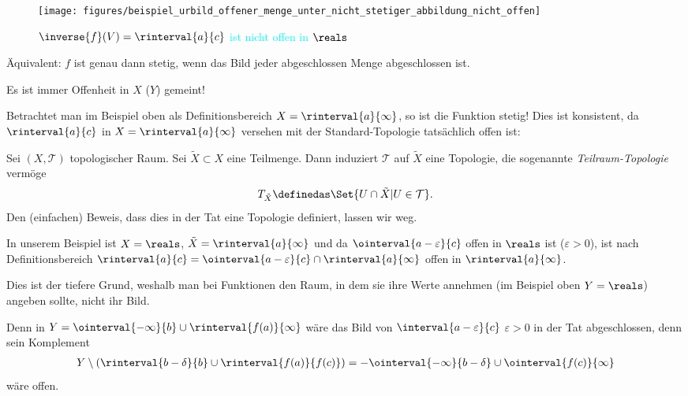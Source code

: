 \begin{figure}[H]
    \centering
    \texttt{[image: figures/beispiel\_urbild\_offener\_menge\_unter\_nicht\_stetiger\_abbildung\_nicht\_offen]}
    \caption*{\textcolor{Cyan}{\( \inverse{f}(V)=\rinterval{a}{c} \) ist nicht offen in \( \reals \)}}
    \label{fig:beispiel_urbild_offener_menge_unter_nicht_stetiger_abbildung_nicht_offen}
\end{figure}
\begin{bemerkung*}
    Äquivalent: \( f \) ist genau dann stetig, wenn das Bild jeder abgeschlossen Menge abgeschlossen ist.
\end{bemerkung*}
Es ist immer Offenheit in \( X \) (\bzw \( Y \)) gemeint!

Betrachtet man im Beispiel oben als Definitionsbereich \( X=\rinterval{a}{\infty} \), so ist die Funktion stetig! 
Dies ist konsistent, da \( \rinterval{a}{c} \) in \( X=\rinterval{a}{\infty} \) versehen mit der Standard-Topologie tatsächlich offen ist:
\begin{defsatz}
    Sei \( (X,\mathcal{T}) \) topologischer Raum. Sei \( \tilde{X}\subset X \) eine Teilmenge. Dann induziert \( \mathcal{T} \) auf \( \tilde{X}  \) eine Topologie, die sogenannte \emph{Teilraum-Topologie} vermöge
    \begin{align*}
        T_{\tilde{X}}\definedas \Set{U\cap \tilde{X}|U\in \mathcal{T}}.
    \end{align*}
    Den (einfachen) Beweis, dass dies in der Tat eine Topologie definiert, lassen wir weg.
\end{defsatz}

In unserem Beispiel ist \( X=\reals \), \( \tilde{X}=\rinterval{a}{\infty} \) und da \( \ointerval{a-\varepsilon}{c} \) offen in \( \reals \) ist (\( \varepsilon>0 \)), ist nach Definitionsbereich \( \rinterval{a}{c}=\ointerval{a-\varepsilon}{c}\cap \rinterval{a}{\infty} \) offen in \( \rinterval{a}{\infty} \).

Dies ist der tiefere Grund, weshalb man bei Funktionen den Raum, in dem sie ihre Werte annehmen (im Beispiel oben \( Y=\reals \)) angeben sollte, nicht ihr Bild.

Denn in \( Y =\ointerval{-\infty}{b}\cup \rinterval{f(a)}{\infty}\) wäre das Bild von \( \interval{a-\varepsilon}{c}\) \tforall \( \varepsilon>0 \) in der Tat abgeschlossen, denn sein Komplement
\begin{align*}
    Y\setminus (\rinterval{b-\delta}{b}\cup \rinterval{f(a)}{f(c)})=-\ointerval{-\infty
    }{b-\delta}\cup \ointerval{f(c)}{\infty}
\end{align*}
wäre offen.

